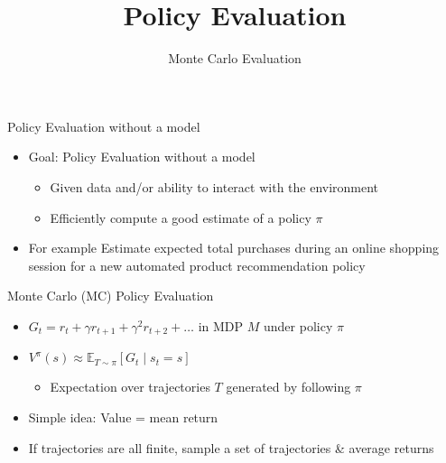 \documentclass[aspectratio=169]{../latex_main/tntbeamer}  %
\title[Reinforcement Learning: Policy Evaluation]{Policy Evaluation}
\subtitle{Monte Carlo Evaluation}
\begin{document}
	
	\maketitle

\begin{frame}[c]{Policy Evaluation without a model}

\begin{itemize}
	\item Goal: Policy Evaluation without a model
	\begin{itemize}
		\item  	Given data and/or ability to interact with the environment
		\item Efficiently compute a good estimate of a policy $\pi$
	\end{itemize}
	\smallskip
	\item For example Estimate expected total purchases during an online shopping session for a new automated product recommendation policy
\end{itemize}



\end{frame}
\begin{frame}[c]{Monte Carlo (MC) Policy Evaluation}

\begin{itemize}
	\item $G_t = r_t + \gamma r_{t+1} + \gamma^2 r_{t+2} + \ldots$ in MDP $M$ under policy $\pi$
	\smallskip
	\item $V^\pi(s) \approx \mathbb{E}_{T \sim \pi} [G_t \mid s_t = s]$
	\begin{itemize}
		\item Expectation over trajectories $T$ generated by following $\pi$
	\end{itemize}
 	\smallskip
	\item Simple idea: Value = mean return
	\item If trajectories are all finite, sample a set of trajectories \& average returns
\end{itemize}

\end{frame}
\end{document}
